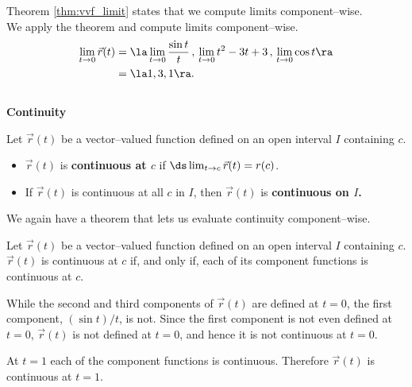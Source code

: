 Theorem \ref{thm:vvf_limit} states that we compute limits component--wise.\\

{We apply the theorem and compute limits component--wise.
\begin{align*}
\lim_{t\to0} \vec r(t) &= \la \lim_{t\to 0}\frac{\sin t}{t}\, , \, \lim_{t\to 0} t^2-3t+3\, , \, \lim_{t\to 0} \cos t\ra \\
			&= \la 1,3,1\ra.
\end{align*}
\baselineskip
}\\

\noindent\textbf{Continuity}\\

{Let $\vec r(t)$ be a vector--valued function defined on an open interval $I$ containing $c$.
\begin{itemize}
	\item $\vec r(t)$ is \textbf{continuous at $c$} if $\ds \lim_{t\to c} \vec r(t) = r(c)$.
	\item	If $\vec r(t)$ is continuous at all $c$ in $I$, then $\vec r(t)$ is \textbf{continuous on $I$.}
\end{itemize}
}

We again have a theorem that lets us evaluate continuity component--wise.

{Let $\vec r(t)$ be a vector--valued function defined on an open interval $I$ containing $c$. $\vec r(t)$ is continuous at $c$ if, and only if, each of its component functions is continuous at $c$.
}\\

{While the second and third components of $\vec r(t)$ are defined at $t=0$, the first component, $(\sin t)/t$, is not. Since the first component is not even defined at $t=0$, $\vec r(t)$ is not defined at $t=0$, and hence it is not continuous at $t=0$.

At $t=1$ each of the component functions is continuous. Therefore $\vec r(t)$ is continuous at $t=1$.
}\\

